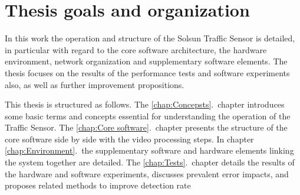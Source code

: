 \section{Thesis goals and organization}
In this work the operation and structure of the Solsun Traffic Sensor is detailed, in particular with regard to the core software architecture, the hardware environment, network organization and supplementary software elements.
The thesis focuses on the results of the performance tests and software experiments also, as well as further improvement propositions.

This thesis is structured as follows.
The \ref{chap:Concepsts}.~chapter introduces some basic terms and concepts essential for understanding the operation of the Traffic Sensor. 
The \ref{chap:Core software}.~chapter presents the structure of the core software side by side with the video processing steps.
In chapter \ref{chap:Environment}.~the supplementary software and hardware elements linking the system together are detailed.
The \ref{chap:Tests}.~chapter details the results of the hardware and software experiments, discusses prevalent error impacts, and proposes related methods to improve detection rate

